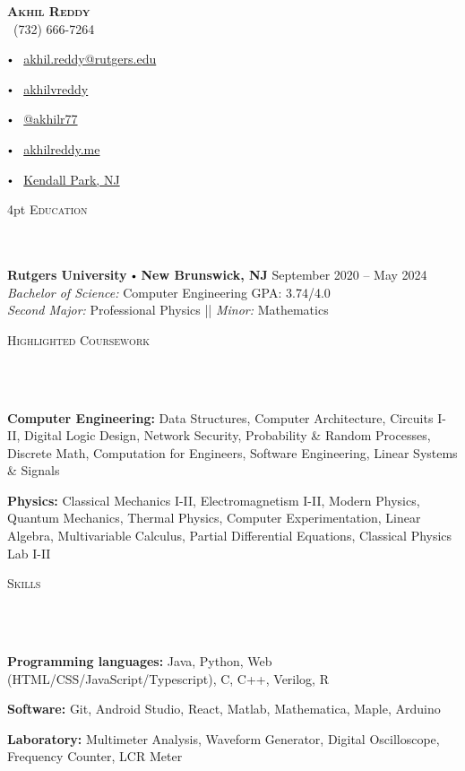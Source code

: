 \documentclass{article}
\newcommand{\contact}[3]{
\vspace*{3pt}
\begin{center}
{\LARGE \scshape {#1}}\\
\vspace{5pt}
#2 
\vspace{2pt}
#3
\end{center}
\vspace*{-8pt}
}
\newcommand{\header}[1]{{
\hspace*{0pt}\vspace*{6pt} \textsc{#1}} \vspace*{-6pt} 
\lineunder
}
\newcommand{\lineunder}{
\vspace*{-8pt} \\ \hspace*{-3pt} 
\hrulefill \\
}
\newcommand{\college}[7]{
\textbf{#1} \labelitemi \textbf{#2} \hfill #3 \\ #4 \hfill #7 \\ #5 \\ #6 \vspace*{5pt}
}
\renewcommand{\labelitemi}{
$\vcenter{\hbox{\tiny$\bullet$}}$\hspace*{3pt}
}
\renewcommand{\labelitemii}{
$\vcenter{\hbox{\tiny$\bullet$}}$\hspace*{-3pt}
}
\newenvironment{bullet-list-major}{
\begin{list}{\labelitemii}{\setlength\leftmargin{9pt} 
\topsep 0pt \itemsep -2pt}}{\vspace*{4pt}\end{list}
}
\begin{document}
\small
\smallskip
\vspace*{-44pt}

\contact{\textbf{Akhil Reddy}}
{\faPhone\ (732) 666-7264
\labelitemi \faEnvelope\ \href{mailto:avr54@scarletmail.rutgers.edu}{akhil.reddy@rutgers.edu}
\labelitemi \faLinkedin\ \href{https://www.linkedin.com/in/akhilvreddy/}{akhilvreddy}
\labelitemi \faGithub\ \href{https://github.com/akhilvreddy}{@akhilr77}%
\labelitemi \faLink\ \href{https://akhilvreddy.github.io}{akhilreddy.me}
\labelitemi \faGlobe\ 
\href{https://www.google.com/maps/place/Kendall+Park,+South+Brunswick+Township,+NJ/@40.4202457,-74.6082391,11.94z/data=!4m5!3m4!1s0x89c3c2c402e2b9a9:0x7185a0a5d268d50!8m2!3d40.4209391!4d-74.560711}{Kendall Park, NJ}
}

\vspace{4pt}
\header{Education}
    \college{Rutgers University}{New Brunswick, NJ}{September 2020 -- May 2024}
    {\textit{Bachelor of Science:}  Computer Engineering}
    {\textit{Second Major:} Professional Physics ||  \textit{Minor: }Mathematics}{} 
    {GPA: 3.74/4.0}

    
\vspace*{4pt}%
\header{Highlighted Coursework}
    \begin{bullet-list-major}
    \item \textbf{Computer Engineering:} Data Structures, Computer Architecture, Circuits I-II, Digital Logic Design, Network Security, Probability \& Random Processes, Discrete Math, Computation for Engineers, Software Engineering, Linear Systems \& Signals
    \item \textbf{Physics:} Classical Mechanics I-II, Electromagnetism I-II, Modern Physics, Quantum Mechanics, Thermal Physics, Computer Experimentation, Linear Algebra, Multivariable Calculus, Partial Differential Equations, Classical Physics Lab I-II
    \end{bullet-list-major}

\vspace*{4pt}%
\header{Skills}
    \begin{bullet-list-major}
    \item \textbf{Programming languages:} Java, Python, Web (HTML/CSS/JavaScript/Typescript), C, C++, Verilog, R
    \item \textbf{Software:} Git, Android Studio, React, Matlab, Mathematica, Maple, Arduino
    \item \textbf{Laboratory:} Multimeter Analysis, Waveform Generator, Digital Oscilloscope, Frequency Counter, LCR Meter

    \end{bullet-list-major}
    
\end{document}
